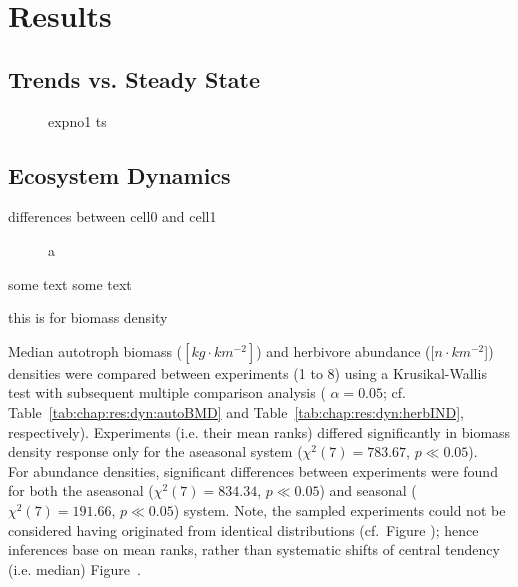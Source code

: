\chapter{Results}
\label{chap:res}


\section{Trends vs. Steady State}
\label{chap:res:dyn:trend}

\begin{figure}
\centering

\caption[Body mass density time series for experiment 1]{expno1 ts}
\label{fig:chap:res:ts:expno1}
\end{figure}

\begin{figure}
\centering

\caption[ShortCap]{}
\label{fig:chap:res:tsinit}
\end{figure}


\section{Ecosystem Dynamics}
\label{chap:res:dyn} 
differences between cell0 and cell1

\begin{figure}
\centering

\caption[Average body mass (aseasonal system)]{a}
\label{fig:chap:res:dyn:c0}
\end{figure}


some text some text




this is for biomass density
%


Median autotroph biomass ($[kg\cdot km^{-2}]$) and herbivore abundance ($[n\cdot km^{-2}$]) densities were compared between experiments (1 to 8) using a Krusikal-Wallis test with subsequent multiple comparison analysis ( $\alpha = 0.05$; cf. Table~\ref{tab:chap:res:dyn:autoBMD} and Table~\ref{tab:chap:res:dyn:herbIND}, respectively). 
Experiments (i.e. their mean ranks) differed significantly in biomass density response only for the aseasonal  system ($\chi^{2}(7) = 783.67$, $p \ll 0.05$). 
\\
For abundance densities, significant differences between experiments were found for both the aseasonal ($\chi^{2}(7) = 834.34$, $p \ll 0.05$) and seasonal ($\chi^{2}(7) = 191.66$, $p \ll 0.05$) system. 
Note, the sampled experiments could not be considered having originated from identical distributions (cf.~Figure ); 
hence inferences base on mean ranks, rather than systematic shifts of central tendency (i.e. median) Figure~.

